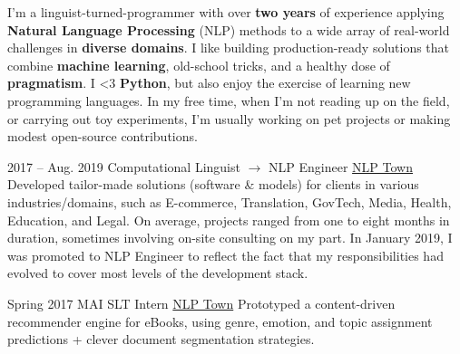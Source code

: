 \documentclass[9pt]{developercv} %
\begin{document}
\vspace{1em}

\begin{minipage}[]{\textwidth}
    \slashsep{}%
    \slashsep{}%
    \slashsep{}
    
    \vspace{-0.5em}
    \slashsep{} 
\end{minipage}


I'm a linguist-turned-programmer with over \textbf{two years} of experience
applying \textbf{Natural Language Processing} (NLP) methods to a wide array of
real-world challenges in \textbf{diverse domains}. I like building
production-ready solutions that combine \textbf{machine learning}, old-school
tricks, and a healthy dose of \textbf{pragmatism}. I <3 \textbf{Python}, but
also enjoy the exercise of learning new programming languages. In my free time,
when I'm not reading up on the field, or carrying out toy experiments, I'm
usually working on pet projects or making modest open-source contributions.



\begin{entrylist}
	\entry
		{2017 -- Aug. 2019}
        {Computational Linguist $\longrightarrow$  NLP Engineer}
        {\href{http://nlp.town}{NLP Town}}
        {Developed tailor-made solutions (software \& models) for clients in
         various industries/domains, such as E-commerce, Translation, GovTech, Media,
         Health, Education, and Legal. On average, projects ranged from one to eight 
         months in duration, sometimes involving on-site consulting on my part. In January
         2019, I was promoted to NLP Engineer to reflect the fact that my
         responsibilities had evolved to cover most levels of the development stack.}

	\entry
		{Spring 2017}
		{MAI SLT Intern}
        {\href{http://nlp.town}{NLP Town}}
        {Prototyped a content-driven recommender engine for eBooks, using genre,
         emotion, and topic assignment predictions + clever document segmentation
         strategies.}
\end{entrylist}
\end{document}
